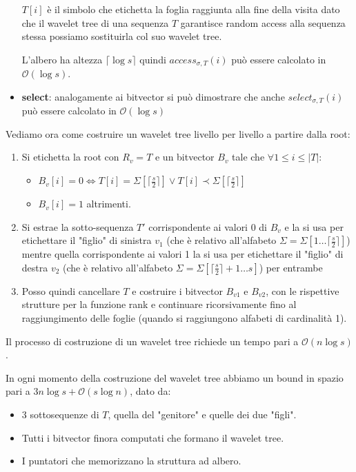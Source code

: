 \begin{itemize}
          $T[i]$ è il simbolo che etichetta la foglia raggiunta alla fine della
          visita dato che il wavelet tree di una sequenza $T$ garantisce random
          access alla sequenza stessa possiamo sostituirla col suo wavelet tree.

          L'albero ha altezza $\lceil\log s \rceil$ quindi $access_{\sigma,T} (i)$
          può essere calcolato in $\mathcal{O}(\log s)$.

    \item \textbf{select}: analogamente ai bitvector si può dimostrare che anche
          $select_{\sigma,T}(i)$ può essere calcolato in $\mathcal{O}(\log s)$
\end{itemize}
Vediamo ora come costruire un wavelet tree livello per livello a partire dalla
root:
\begin{enumerate}
    \item Si etichetta la root con $R_v = T$ e un bitvector $B_v$ tale che $\forall 1 \leq i \leq |T|$:
          \begin{itemize}
              \item $B_v[i] = 0 \iff T[i] = \Sigma[\lceil \frac{s}{2} \rceil] \lor T[i] \prec \Sigma[\lceil \frac{s}{2} \rceil]$
              \item $B_v[i] = 1$ altrimenti.
          \end{itemize}
    \item Si estrae la sotto-sequenza $T'$ corrispondente ai valori 0 di $B_v$ e
          la si usa per etichettare il "figlio" di sinistra $v_1$ (che è relativo
          all'alfabeto $\Sigma = \Sigma[1 \dots \lceil \frac{s}{2} \rceil]$) mentre
          quella corrispondente ai valori 1 la si usa per etichettare il "figlio" di
          destra $v_2$ (che è relativo all'alfabeto $\Sigma = \Sigma[\lceil \frac{s}{2} \rceil + 1 \dots s]$) per entrambe
    \item Posso quindi cancellare $T$ e costruire i bitvector $B_{v1}$ e $B_{v2}$,
          con le rispettive strutture per la funzione rank e continuare ricorsivamente
          fino al raggiungimento delle foglie (quando si raggiungono alfabeti di cardinalità 1).
\end{enumerate}
Il processo di costruzione di un wavelet tree richiede un tempo pari a $\mathcal{O}(n \log s)$.

In ogni momento della costruzione del wavelet tree abbiamo un bound in spazio
pari a $3n \log s + \mathcal{O}(s \log n)$, dato da:
\begin{itemize}
    \item 3 sottosequenze di $T$, quella del "genitore" e quelle dei due "figli".
    \item Tutti i bitvector finora computati che formano il wavelet tree.
    \item I puntatori che memorizzano la struttura ad albero.
\end{itemize}


